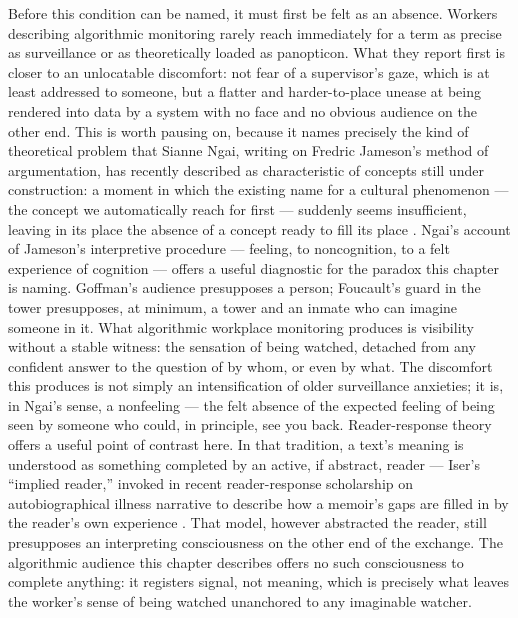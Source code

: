 \documentclass[12pt, a4paper]{article}
\begin{document}
Before this condition can be named, it must first be felt as an absence. Workers describing algorithmic monitoring rarely reach immediately for a term as precise as surveillance or as theoretically loaded as panopticon. What they report first is closer to an unlocatable discomfort: not fear of a supervisor's gaze, which is at least addressed to someone, but a flatter and harder-to-place unease at being rendered into data by a system with no face and no obvious audience on the other end. This is worth pausing on, because it names precisely the kind of theoretical problem that Sianne Ngai, writing on Fredric Jameson's method of argumentation, has recently described as characteristic of concepts still under construction: a moment in which the existing name for a cultural phenomenon --- the concept we automatically reach for first --- suddenly seems insufficient, leaving in its place the absence of a concept ready to fill its place \parencite{ngai2026thresholds}. Ngai's account of Jameson's interpretive procedure --- feeling, to noncognition, to a felt experience of cognition --- offers a useful diagnostic for the paradox this chapter is naming. Goffman's audience presupposes a person; Foucault's guard in the tower presupposes, at minimum, a tower and an inmate who can imagine someone in it. What algorithmic workplace monitoring produces is visibility without a stable witness: the sensation of being watched, detached from any confident answer to the question of by whom, or even by what. The discomfort this produces is not simply an intensification of older surveillance anxieties; it is, in Ngai's sense, a nonfeeling --- the felt absence of the expected feeling of being seen by someone who could, in principle, see you back. Reader-response theory offers a useful point of contrast here. In that tradition, a text's meaning is understood as something completed by an active, if abstract, reader --- Iser's ``implied reader,'' invoked in recent reader-response scholarship on autobiographical illness narrative to describe how a memoir's gaps are filled in by the reader's own experience \parencite{vailankanni2025reconstructing}. That model, however abstracted the reader, still presupposes an interpreting consciousness on the other end of the exchange. The algorithmic audience this chapter describes offers no such consciousness to complete anything: it registers signal, not meaning, which is precisely what leaves the worker's sense of being watched unanchored to any imaginable watcher.
\end{document}
